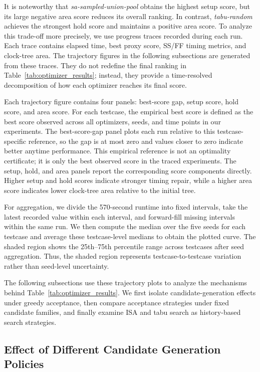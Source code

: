 \documentclass{article}
\begin{document}
It is noteworthy that \textit{sa-sampled-union-pool} obtains the highest setup score, but its large negative area score reduces its overall ranking.  In contrast, \textit{tabu-random} achieves the strongest hold score and maintains a positive area score. To analyze this trade-off more precisely, we use progress traces recorded during each run. Each trace contains elapsed time, best proxy score, SS/FF timing metrics, and clock-tree area. The trajectory figures in the following subsections are generated from these traces.  They do not redefine the final ranking in Table~\ref{tab:optimizer_results}; instead, they provide a time-resolved decomposition of how each optimizer reaches its final score.

Each trajectory figure contains four panels: best-score gap, setup score, hold score, and area score.  For each testcase, the empirical best score is defined as the best score observed across all optimizers, seeds, and time points in our experiments.  The best-score-gap panel plots each run relative to this testcase-specific reference, so the gap is at most zero and values closer to zero indicate better anytime performance.  This empirical reference is not an optimality certificate; it is only the best observed score in the traced experiments.  The setup, hold, and area panels report the corresponding score components directly.  Higher setup and hold scores indicate stronger timing repair, while a higher area score indicates lower clock-tree area relative to the initial tree.

For aggregation, we divide the 570-second runtime into fixed intervals, take the latest recorded value within each interval, and forward-fill missing intervals within the same run.  We then compute the median over the five seeds for each testcase and average these testcase-level medians to obtain the plotted curve. The shaded region shows the 25th--75th percentile range across testcases after seed aggregation.  Thus, the shaded region represents testcase-to-testcase variation rather than seed-level uncertainty.

The following subsections use these trajectory plots to analyze the mechanisms behind Table~\ref{tab:optimizer_results}.  We first isolate candidate-generation effects under greedy acceptance, then compare acceptance strategies under fixed candidate families, and finally examine ISA and tabu search as history-based search strategies.


\subsection{Effect of Different Candidate Generation Policies}
\end{document}
